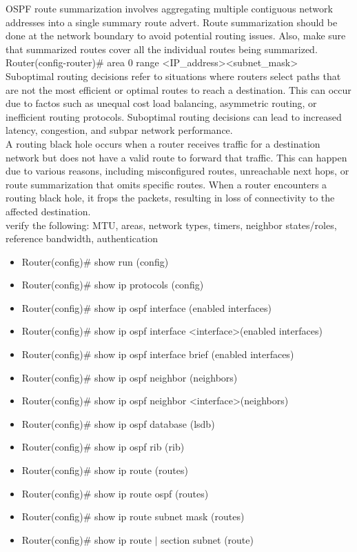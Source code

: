 \documentclass{article}
\begin{document}
	OSPF route summarization involves aggregating multiple contiguous network addresses into a single summary route advert. Route summarization should be done at the network boundary to avoid potential routing issues. Also, make sure that summarized routes cover all the individual routes being summarized.\\
	
Router(config-router)\# area 0 range \textless IP\_address\textgreater \textless subnet\_mask\textgreater\\

  		Suboptimal routing decisions refer to situations where routers select paths that are not the most efficient or optimal routes to reach a destination. This can occur due to factos such as unequal cost load balancing, asymmetric routing, or inefficient routing protocols. Suboptimal routing decisions can lead to increased latency, congestion, and subpar network performance.\\
		
		A routing black hole occurs when a router receives traffic for a destination network but does not have a valid route to forward that traffic. This can happen due to various reasons, including misconfigured routes, unreachable next hops, or route summarization that omits specific routes. When a router encounters a routing black hole, it frops the packets, resulting in loss of connectivity to the affected destination.\\
  		
verify the following: MTU, areas, network types, timers, neighbor states/roles, reference bandwidth, authentication
\begin{itemize}
\item Router(config)\# show run (config)
\item Router(config)\# show ip protocols (config)  		
\item Router(config)\# show ip ospf interface (enabled interfaces)
\item Router(config)\# show ip ospf interface \textless interface\textgreater (enabled interfaces)
\item Router(config)\# show ip ospf interface brief (enabled interfaces)  		
\item Router(config)\# show ip ospf neighbor (neighbors)
\item Router(config)\# show ip ospf neighbor \textless interface\textgreater (neighbors)  		
\item Router(config)\# show ip ospf database (lsdb)  		
\item Router(config)\# show ip ospf rib (rib)  		
\item Router(config)\# show ip route (routes)
\item Router(config)\# show ip route ospf (routes)
\item Router(config)\# show ip route subnet mask (routes)
\item Router(config)\# show ip route $\mid$ section subnet (route)
\end{itemize}
  
\end{document}
